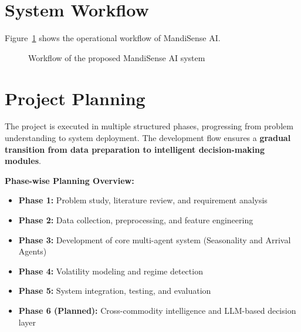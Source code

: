 \documentclass[12pt,a4paper]{report}
\begin{document}
\section{System Workflow}

Figure~\ref{fig:system_workflow} shows the operational workflow of MandiSense AI.

\begin{figure}[H]
\centering
{}
\caption{Workflow of the proposed MandiSense AI system}
\label{fig:system_workflow}
\end{figure}

\section{Project Planning}

\noindent
The project is executed in multiple structured phases, progressing from problem understanding to system deployment. The development flow ensures a \textbf{gradual transition from data preparation to intelligent decision-making modules}.

\vspace{0.5em}

\noindent
\textbf{Phase-wise Planning Overview:}
\begin{itemize}
    \item \textbf{Phase 1:} Problem study, literature review, and requirement analysis
    \item \textbf{Phase 2:} Data collection, preprocessing, and feature engineering
    \item \textbf{Phase 3:} Development of core multi-agent system (Seasonality and Arrival Agents)
    \item \textbf{Phase 4:} Volatility modeling and regime detection
    \item \textbf{Phase 5:} System integration, testing, and evaluation
    \item \textbf{Phase 6 (Planned):} Cross-commodity intelligence and LLM-based decision layer
\end{itemize}
\end{document}
